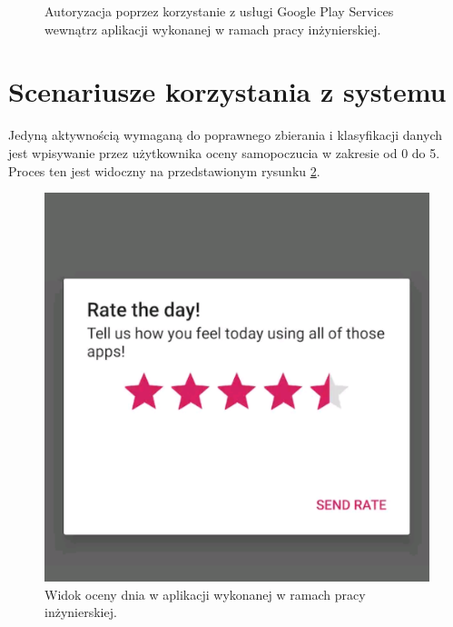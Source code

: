 \documentclass[a4paper,twoside,12pt]{book}
\begin{document}
\begin{figure}[h!]
    \caption{Autoryzacja poprzez korzystanie z usługi Google Play Services wewnątrz aplikacji wykonanej w ramach pracy inżynierskiej.}
    \label{fig:auth_screen}
\end{figure}

\section{Scenariusze korzystania z systemu}
Jedyną aktywnością wymaganą do poprawnego zbierania i klasyfikacji danych jest wpisywanie przez użytkownika oceny samopoczucia w zakresie od 0 do 5. Proces ten jest widoczny na przedstawionym rysunku \ref{fig:rate_screen}. 
\begin{figure}[h!]
    \centering
    \includegraphics[scale=0.2]{images/rate_screen.png}
    \caption{Widok oceny dnia w aplikacji wykonanej w ramach pracy inżynierskiej.}
    \label{fig:rate_screen}
\end{figure}
\end{document}
